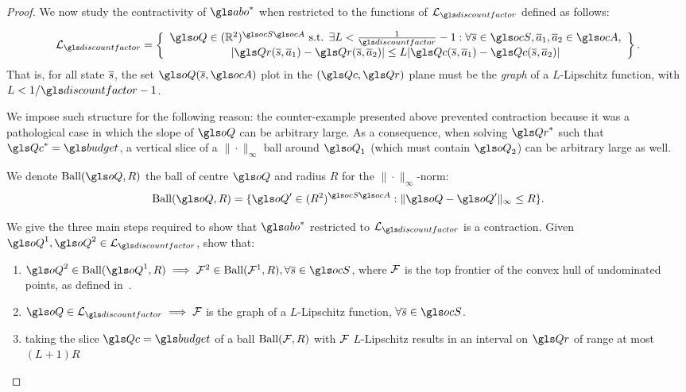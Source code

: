 \begin{proof}
    We now study the contractivity of $\abo^{*}$ when restricted to the functions of $\cL_{\discountfactor}$ defined as follows:

    \begin{equation}
        \cL_{\discountfactor} = \left\{\begin{array}{cc}

                                           \oQ\in(\Real^2)^{\ocS\ocA}\text{ s.t. }\exists L<\frac{1}{\discountfactor}-1: \forall \os\in\ocS,\oa_1,\oa_2\in\ocA,   \\

                                           |\Qr(\os,\oa_1) - \Qr(\os,\oa_2)| \leq L|\Qc(\os,\oa_1) - \Qc(\os,\oa_2)|
        \end{array}\right\}.
    \end{equation}
    That is, for all state $\overline{s}$, the set $\oQ(\os, \ocA)$ plot in the $(\Qc,\Qr)$ plane must be the \emph{graph} of a $L$-Lipschitz function, with $L<1/\discountfactor-1$.

    We impose such structure for the following reason: the counter-example presented above prevented contraction because it was a pathological case in which the slope of $\oQ$ can be arbitrary large. As a consequence, when solving $\Qr^*$ such that $\Qc^*=\budget$, a vertical slice of a $\|\cdot\|_\infty$ ball around $\oQ_1$ (which must contain $\oQ_2$) can be arbitrary large as well.


    We denote $\text{Ball}(\oQ,R)$ the ball of centre $\oQ$ and radius $R$ for the $\|\cdot\|_\infty$-norm:
    \begin{equation*}
        \text{Ball}(\oQ,R) = \{\oQ'\in(R^2)^{\ocS\ocA}: \|\oQ-\oQ'\|_\infty \leq R\}.
    \end{equation*}

    We give the three main steps required to show that $\abo^{*}$ restricted to $\cL_{\discountfactor}$ is a contraction. Given $\oQ^1, \oQ^2\in\cL_{\discountfactor}$, show that:

    \begin{enumerate}
        \item $\oQ^2\in\text{Ball}(\oQ^1,R)\implies\cF^2\in\text{Ball}(\cF^1, R), \forall\os\in\ocS$, where $\mathcal{F}$ is the top frontier of the convex hull of undominated points, as defined in~.
        \item $\oQ\in\cL_{\discountfactor} \implies \cF$ is the graph of a $L$-Lipschitz function, $\forall\os\in\ocS$.
        \item taking the slice $\Qc=\budget$ of a ball $\text{Ball}(\mathcal{F},R)$ with $\mathcal{F}$ $L$-Lipschitz results in an interval on $\Qr$ of range at most $(L+1)R$
    \end{enumerate}


\end{proof}
